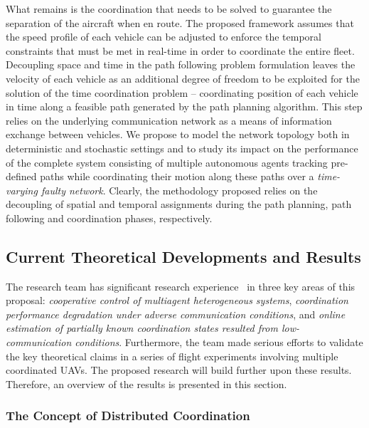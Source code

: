 \documentclass[letter,onecolumn,12pt]{aiaa-tc}
\newcommand{\1}{1_n}
\begin{document}
What remains is the coordination that needs to be solved to guarantee the separation of the aircraft when en route. The proposed framework assumes that the speed profile of each vehicle can be adjusted to enforce the temporal constraints that must be met in real-time in order to coordinate the entire fleet. Decoupling space and time in the path following problem formulation leaves the velocity of each  vehicle as an additional  degree of freedom to be exploited for the solution of the time coordination problem -- coordinating position of each vehicle in time along a feasible path generated by the path planning algorithm.  This step relies on the underlying communication network as a means of information exchange between vehicles. We propose to model the network topology both in deterministic and stochastic settings and to study its impact on the performance of the complete system consisting of multiple autonomous agents tracking pre-defined paths while coordinating their motion along these paths over a \emph{ time-varying faulty network}. Clearly, the methodology proposed relies on the decoupling of spatial and temporal assignments during the path planning, path following and coordination phases, respectively.

\subsection{Current Theoretical Developments and Results}
\label{subsec:current_develop}

The research team has significant research experience~\cite{xargay2012csm} in three key areas of this proposal: \emph{cooperative control of multiagent heterogeneous systems}, \emph{coordination performance degradation under adverse communication conditions}, and \emph{online estimation of partially known coordination states resulted from low-communication conditions}. Furthermore, the team made serious efforts to validate the key theoretical claims in a series of flight experiments involving multiple coordinated UAVs. The proposed research will build further upon these results. Therefore, an overview of the results is presented in this section.

\subsubsection{The Concept of Distributed Coordination }
\end{document}

